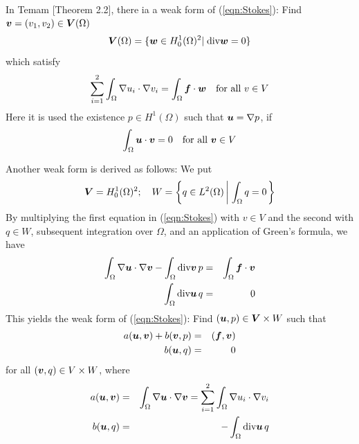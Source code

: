 \documentclass[a4paper,twoside,12pt]{book}
\def\vec#1{\mbox{\boldmath $#1$}}
\begin{document}
In Temam [Theorem 2.2], there ia a weak form of (\ref{eqn:Stokes}):
Find $\vec{v}=(v_1,v_2)\in \vec{V}(\Omega)$
\[
\vec{V}(\Omega)=\{\vec{w}\in H^1_0(\Omega)^2|\; \textrm{div}\vec{w}=0\}
\]
which satisfy
\[
\sum_{i=1}^2\int_{\Omega}\nabla u_i\cdot \nabla v_i=\int_{\Omega}\vec{f}\cdot \vec{w}
\quad \textrm{for all }v\in V
\]
Here it is used the existence
$p\in H^1(\Omega)$ such that $\vec{u}=\nabla p$, if
\[
\int_{\Omega}\vec{u}\cdot \vec{v}=0\quad \textrm{for all }\vec{v}\in
V
\]
\medskip

Another weak form is derived as follows: We put
\begin{eqnarray*}
\vec{V}=H^1_0(\Omega)^2;\quad
W=\left\{q\in L^2(\Omega)\left|\; \int_{\Omega}q=0\right.\right\}
\end{eqnarray*}
By multiplying the first equation in (\ref{eqn:Stokes}) with $v\in V$ and the
second with $q\in W$, subsequent integration over $\Omega$, and an
application of Green's formula, we have
\begin{eqnarray*}
\int_{\Omega}\nabla\vec{u}\cdot \nabla\vec{v}-\int_{\Omega}\textrm{div}\vec{v}\, p
&=&\int_{\Omega}\vec{f}\cdot\vec{v}\\
\int_{\Omega}\textrm{div}\vec{u}\, q&=&0
\end{eqnarray*}
This yields the weak form of (\ref{eqn:Stokes}):
Find $(\vec{u},p)\in \vec{V}\times W$ such that
\begin{eqnarray}
\label{eqn:wStokes-1}
a(\vec{u},\vec{v})+b(\vec{v},p)&=&(\vec{f},\vec{v})\\
\label{eqn:wStokes-2}
b(\vec{u},q)&=&0
\end{eqnarray}
for all $(\vec{v},q)\in V\times W$, where
\begin{eqnarray}
\label{eqn:Stokes-a}
a(\vec{u},\vec{v})&=&\int_{\Omega}\nabla \vec{u}\cdot \nabla\vec{v}
=\sum_{i=1}^2\int_{\Omega}\nabla u_i\cdot \nabla v_i\\
\label{eqn:Stokes-b}
b(\vec{u},q)&=&-\int_{\Omega}\textrm{div}\vec{u}\, q
\end{eqnarray}
\end{document}
